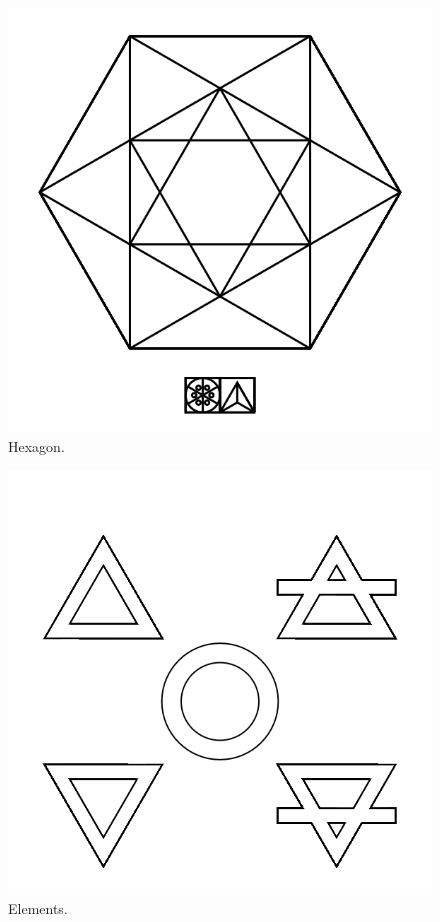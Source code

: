 \documentclass{report}
\begin{document}
\begin{figure}
	\centering
	\includegraphics[width=5in]{imageserver/uploadimages/image5.png}
	\caption{Hexagon.}
\end{figure}

\begin{figure}
	\centering
	\includegraphics[width=5in]{imageserver/uploadimages/image6.png}
	\caption{Elements.}
\end{figure}
\end{document}

